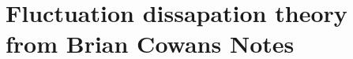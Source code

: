 \section{Fluctuation dissapation theory from Brian Cowans Notes}\label{sec:fluctuationDissapation}
% 		
% 		
% 		

